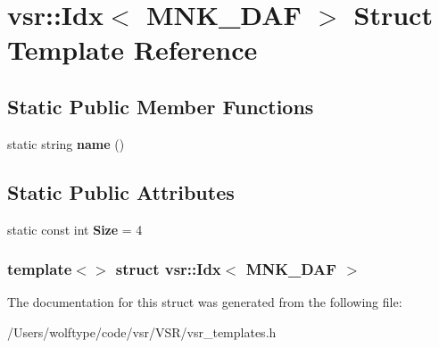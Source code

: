 \hypertarget{structvsr_1_1_idx_3_01_m_n_k___d_a_f_01_4}{\section{vsr\-:\-:Idx$<$ M\-N\-K\-\_\-\-D\-A\-F $>$ Struct Template Reference}
\label{structvsr_1_1_idx_3_01_m_n_k___d_a_f_01_4}
}
\subsection*{Static Public Member Functions}
\begin{DoxyCompactItemize}
\item 
\hypertarget{structvsr_1_1_idx_3_01_m_n_k___d_a_f_01_4_a083fafb43e2edbad3ca942855fe8afa8}{static string {\bfseries name} ()}\label{structvsr_1_1_idx_3_01_m_n_k___d_a_f_01_4_a083fafb43e2edbad3ca942855fe8afa8}

\end{DoxyCompactItemize}
\subsection*{Static Public Attributes}
\begin{DoxyCompactItemize}
\item 
\hypertarget{structvsr_1_1_idx_3_01_m_n_k___d_a_f_01_4_ad04d0dc83445225afeaecf6b94e095c7}{static const int {\bfseries Size} = 4}\label{structvsr_1_1_idx_3_01_m_n_k___d_a_f_01_4_ad04d0dc83445225afeaecf6b94e095c7}

\end{DoxyCompactItemize}
\subsubsection*{template$<$$>$ struct vsr\-::\-Idx$<$ M\-N\-K\-\_\-\-D\-A\-F $>$}



The documentation for this struct was generated from the following file\-:\begin{DoxyCompactItemize}
\item 
/\-Users/wolftype/code/vsr/\-V\-S\-R/vsr\-\_\-templates.\-h\end{DoxyCompactItemize}
